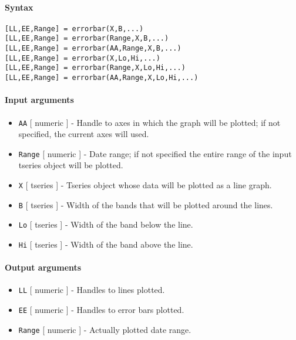


	\paragraph{Syntax}

\begin{verbatim}
[LL,EE,Range] = errorbar(X,B,...)
[LL,EE,Range] = errorbar(Range,X,B,...)
[LL,EE,Range] = errorbar(AA,Range,X,B,...)
[LL,EE,Range] = errorbar(X,Lo,Hi,...)
[LL,EE,Range] = errorbar(Range,X,Lo,Hi,...)
[LL,EE,Range] = errorbar(AA,Range,X,Lo,Hi,...)
\end{verbatim}

\paragraph{Input arguments}

\begin{itemize}
\item
  \texttt{AA} {[} numeric {]} - Handle to axes in which the graph will
  be plotted; if not specified, the current axes will used.
\item
  \texttt{Range} {[} numeric {]} - Date range; if not specified the
  entire range of the input tseries object will be plotted.
\item
  \texttt{X} {[} tseries {]} - Tseries object whose data will be plotted
  as a line graph.
\item
  \texttt{B} {[} tseries {]} - Width of the bands that will be plotted
  around the lines.
\item
  \texttt{Lo} {[} tseries {]} - Width of the band below the line.
\item
  \texttt{Hi} {[} tseries {]} - Width of the band above the line.
\end{itemize}

\paragraph{Output arguments}

\begin{itemize}
\item
  \texttt{LL} {[} numeric {]} - Handles to lines plotted.
\item
  \texttt{EE} {[} numeric {]} - Handles to error bars plotted.
\item
  \texttt{Range} {[} numeric {]} - Actually plotted date range.
\end{itemize}

